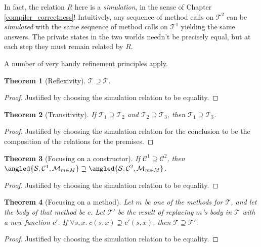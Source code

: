 \documentclass{amsbook}
\newtheorem{theorem}{Theorem}[chapter]
\theoremstyle{definition}
\theoremstyle{remark}
\numberwithin{section}{chapter}
\numberwithin{equation}{chapter}
\begin{document}
In fact, the relation $R$ here is a \emph{simulation}, in the sense of Chapter \ref{compiler_correctness}!
Intuitively, any sequence of method calls on $\mathcal T^2$ can be \emph{simulated} with the same sequence of method calls on $\mathcal T^1$ yielding the same answers.
The private states in the two worlds needn't be precisely equal, but at each step they must remain related by $R$.

A number of very handy refinement principles apply.

\begin{theorem}[Reflexivity]\label{adtrefl}
  $\mathcal T \supseteq \mathcal T$.
\end{theorem}
\begin{proof}
  Justified by choosing the simulation relation to be equality.
\end{proof}

\begin{theorem}[Transitivity]
  If $\mathcal T_1 \supseteq \mathcal T_2$ and $\mathcal T_2 \supseteq \mathcal T_3$, then $\mathcal T_1 \supseteq \mathcal T_3$.
\end{theorem}
\begin{proof}
  Justified by choosing the simulation relation for the conclusion to be the composition of the relations for the premises.
\end{proof}

\begin{theorem}[Focusing on a constructor]
  If $\mathcal C^1 \supseteq \mathcal C^2$, then $\angled{\mathcal S, \mathcal C^1, \mathcal M_{m \in M}} \supseteq \angled{\mathcal S, \mathcal C^2, \mathcal M_{m \in M}}$.
\end{theorem}
\begin{proof}
  Justified by choosing the simulation relation to be equality.
\end{proof}

\begin{theorem}[Focusing on a method]\label{refinemethod}
  Let $m$ be one of the methods for $\mathcal T$, and let the body of that method be $c$.
  Let $\mathcal T'$ be the result of replacing $m$'s body in $\mathcal T$ with a new function $c'$.
  If $\forall s, x. \; c(s, x) \supseteq c'(s, x)$, then $\mathcal T \supseteq \mathcal T'$.
\end{theorem}
\begin{proof}
  Justified by choosing the simulation relation to be equality.
\end{proof}
\end{document}
